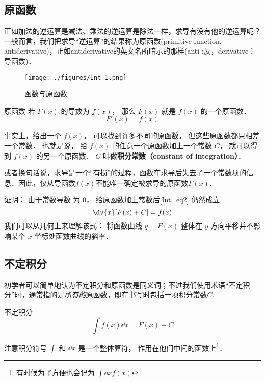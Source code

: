 
\subsection{原函数}
正如加法的逆运算是减法、乘法的逆运算是除法一样，求导有没有他的逆运算呢？一般而言，我们把求导“逆运算”的结果称为原函数(primitive function, antiderivative)，正如antiderivative的英文名所暗示的那样(anti-:反，derivative：导函数)．

\begin{figure}[ht]
\centering
\texttt{[image: ./figures/Int\_1.png]}
\caption{函数与原函数} \label{Int_fig1}
\end{figure}

\begin{definition}{原函数}
若 $F(x)$ 的导数为 $f(x)$， 那么 $F(x)$ 就是  $f(x)$ 的一个原函数．
\begin{equation}\label{Int_eq2}
F'(x) = f(x)
\end{equation}
\end{definition}

\begin{theorem}{}
事实上，给出一个 $f(x)$， 可以找到许多不同的原函数， 但这些原函数都只相差一个常数． 也就是说， 给 $f(x)$ 的任意一个原函数加上一个常数 $C$， 就可以得到 $f(x)$ 的另一个原函数． $C$ 叫做\textbf{积分常数（constant of integration）}．

或者换句话说，求导是一个“有损”的过程，函数在求导后失去了一个常数项的信息．因此，仅从导函数$f(x)$不能唯一确定被求导的原函数$F(x)$．
\end{theorem}

证明： 由于常数导数%
为 $0$， 给原函数加上常数后\autoref{Int_eq2} 仍然成立
\begin{equation}\label{Int_eq3}
\dv{x} [F(x) + C] = f(x)
\end{equation}
我们可以从几何上来理解该式： 将函数曲线 $y = F(x)$ 整体在 $y$ 方向平移并不影响某个 $x$ 坐标处函数曲线的斜率．

\subsection{不定积分}
初学者可以简单地认为不定积分和原函数是同义词；不过我们使用术语“不定积分”时，通常指的是\textsl{所有的}原函数，即在书写时包括一项积分常数$C$.

\begin{definition}{不定积分}
\begin{equation}\label{Int_eq1}
\int f(x) \dd{x} = F(x) + C
\end{equation}
\end{definition}
注意积分符号 $\int$ 和 $\dd{x}$ 是一个整体算符， 作用在他们中间的函数上\footnote{有时候为了方便也会记为 $\int\dd{x} f(x)$}．

